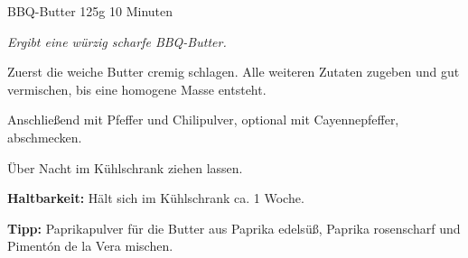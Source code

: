 \documentclass[
  DIV=11,%
  pagesize,%
  fontsize=11pt,%
  paper=a4,%
]{scrartcl}
\begin{document}
\begin{recipe}{BBQ-Butter} {125g} {10 Minuten}

\freeform
\textit{Ergibt eine würzig scharfe BBQ-Butter.}


Zuerst die weiche Butter cremig schlagen.
Alle weiteren Zutaten zugeben und gut vermischen, bis eine homogene Masse entsteht.


Anschließend mit Pfeffer und Chilipulver, optional mit Cayennepfeffer, abschmecken.

\newstep
Über Nacht im Kühlschrank ziehen lassen.

\freeform
\hrulefill

\freeform 
\textbf{Haltbarkeit:}
Hält sich im Kühlschrank ca. 1 Woche.

\freeform 
\textbf{Tipp:}
Paprikapulver für die Butter aus Paprika edelsüß, Paprika rosenscharf und Pimentón de la Vera mischen.

\end{recipe}
\end{document}
